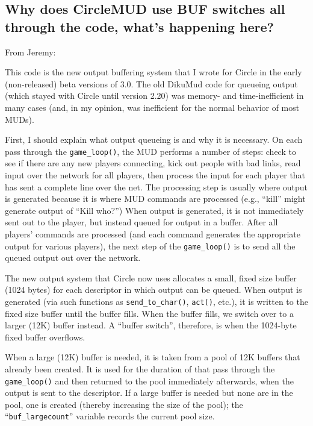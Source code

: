 \documentclass[11pt]{article}
\begin{document}
\subsection{Why does CircleMUD use BUF switches all through the code, what's happening here?}
From Jeremy:
\par
This code is the new output buffering system that I wrote for Circle in the early (non-released) beta versions of 3.0.  The old DikuMud code for queueing output (which stayed with Circle until version 2.20) was memory- and time-inefficient in many cases (and, in my opinion, was inefficient for the normal behavior of most MUDs).
\par
First, I should explain what output queueing is and why it is necessary.  On each pass through the \texttt{game\_loop()}, the MUD performs a number of steps: check to see if there are any new players connecting, kick out people with bad links, read input over the network for all players, then process the input for each player that has sent a complete line over the net.  The processing step is usually where output is generated because it is where MUD commands are processed (e.g., ``kill'' might generate output of ``Kill who?'')  When output is generated, it is not immediately sent out to the player, but instead queued for output in a buffer.  After all players' commands are processed (and each command generates the appropriate output for various players), the next step of the \texttt{game\_loop()} is to send all the queued output out over the network.
\par
The new output system that Circle now uses allocates a small, fixed size  buffer (1024 bytes) for each descriptor in which output can be queued. When output is generated (via such functions as \texttt{send\_to\_char()}, \texttt{act()}, etc.), it is written to the fixed size buffer until the buffer fills. When the buffer fills, we switch over to a larger (12K) buffer instead. A ``buffer switch'', therefore, is when the 1024-byte fixed buffer overflows.
\par
When a large (12K) buffer is needed, it is taken from a pool of 12K buffers that already been created.  It is used for the duration of that pass through the \texttt{game\_loop()} and then returned to the pool immediately afterwards, when the output is sent to the descriptor.  If a large buffer
is needed but none are in the pool, one is created (thereby increasing the size of the pool); the ``\texttt{buf\_largecount}'' variable records the current pool size. 
\par
\end{document}
